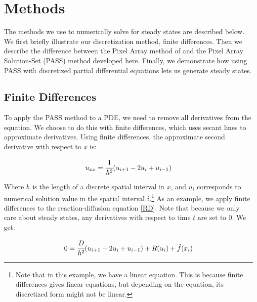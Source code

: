 \documentclass[11pt]{article}
\begin{document}
\section{Methods}\label{sec:methods}

The methods we use to numerically solve for steady states are described below. We first briefly illustrate our discretization method, finite differences. Then we describe the difference between the Pixel Array method of \citep{Introduction_to_PA} and the Pixel Array Solution-Set (PASS) method developed here. Finally, we demonstrate how using PASS with discretized partial differential equations lets us generate steady states.

\subsection{Finite Differences}

To apply the PASS method to a PDE, we need to remove all derivatives from the equation. We choose to do this with finite differences, which uses secant lines to approximate derivatives. Using finite differences, the approximate second derivative with respect to $x$ is:

\begin{equation}
    \label{FD second order}
    u_{xx} = \cfrac{1}{h^2} (u_{i+1} - 2u_i + u_{i-1})
\end{equation}

\noindent Where $h$ is the length of a discrete spatial interval in $x$, and $u_i$ corresponds to numerical solution value in the spatial interval $i$.\footnote{Note that in this example, we have a linear equation. This is because finite differences gives linear equations, but depending on the equation, its discretized form might not be linear.} As an example, we apply finite differences to the reaction-diffusion equation \eqref{RD}. Note that because we only care about steady states, any derivatives with respect to time $t$ are set to 0. We get:

\begin{equation}
    \label{discrete RD}
    0 = \cfrac{D}{h^2} (u_{i+1} - 2u_i + u_{i-1}) + R(u_i) + \hat{f}(x_i)
\end{equation}
\end{document}
